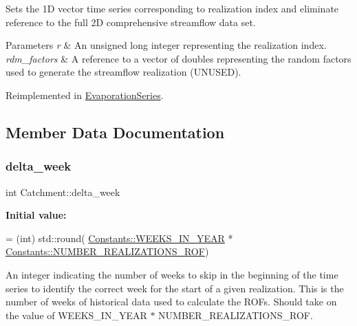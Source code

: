 Sets the 1D vector time series corresponding to realization index and eliminate reference to the full 2D comprehensive streamflow data set. 


\begin{DoxyParams}{Parameters}
{\em r} & An unsigned long integer representing the realization index. \\
\hline
{\em rdm\+\_\+factors} & A reference to a vector of doubles representing the random factors used to generate the streamflow realization (U\+N\+U\+S\+ED). \\
\hline
\end{DoxyParams}


Reimplemented in \mbox{\hyperlink{classEvaporationSeries_a4985ac4c81ec111657861e5750b24c0e}{Evaporation\+Series}}.



\subsection{Member Data Documentation}
\mbox{\label{classCatchment_a20548a9d03f0d39f297cb15b3c0433ad}} 
\subsubsection{\texorpdfstring{delta\+\_\+week}{delta\_week}}
{\footnotesize\ttfamily int Catchment\+::delta\+\_\+week\hspace{0.3cm}{\ttfamily [protected]}}

{\bfseries Initial value\+:}
\begin{DoxyCode}
= (int) std::round(
            \mbox{\hyperlink{classConstants_a19e84af3cbc6e1318beb22408c2a1f2f}{Constants::WEEKS\_IN\_YEAR}} * 
      \mbox{\hyperlink{classConstants_ad6b1922ee031afa4b93176968d060fdf}{Constants::NUMBER\_REALIZATIONS\_ROF}})
\end{DoxyCode}


An integer indicating the number of weeks to skip in the beginning of the time series to identify the correct week for the start of a given realization. This is the number of weeks of historical data used to calculate the R\+O\+Fs. Should take on the value of W\+E\+E\+K\+S\+\_\+\+I\+N\+\_\+\+Y\+E\+AR $\ast$ N\+U\+M\+B\+E\+R\+\_\+\+R\+E\+A\+L\+I\+Z\+A\+T\+I\+O\+N\+S\+\_\+\+R\+OF. 

\mbox{\label{classCatchment_a472ff6892f90d94b8c4dba53c462dedf}} 
